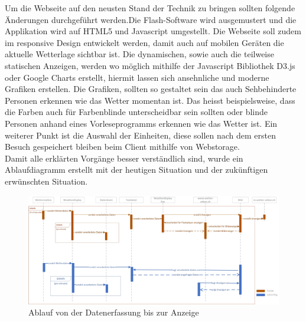 Um die Webseite auf den neusten Stand der Technik zu bringen sollten folgende Änderungen durchgeführt werden.Die Flash-Software wird ausgemustert und die Applikation wird auf HTML5 und Javascript umgestellt. Die Webseite soll zudem im responsive Design entwickelt werden, damit auch auf mobilen Geräten die aktuelle Wetterlage sichtbar ist. Die dynamischen, sowie auch die teilweise statischen Anzeigen, werden wo möglich mithilfe der Javascript Bibliothek D3.js oder Google Charts erstellt, hiermit lassen sich ansehnliche und moderne Grafiken erstellen. Die Grafiken, sollten so gestaltet sein das auch Sehbehinderte Personen erkennen wie das Wetter momentan ist. Das heisst beispielsweise, dass die Farben auch für Farbenblinde unterscheidbar sein sollten oder blinde Personen anhand eines Vorleseprogramms erkennen wie das Wetter ist. Ein weiterer Punkt ist die Auswahl der Einheiten, diese sollen nach dem ersten Besuch gespeichert bleiben beim Client mithilfe von Webstorage.  \\
Damit alle erklärten Vorgänge besser verständlich sind, wurde ein Ablaufdiagramm erstellt mit der heutigen Situation und der zukünftigen erwünschten Situation.
\begin{landscape}
\begin{figure}[htbp]
	\centering
	\includegraphics[width=1\linewidth]{img/Sequenzdiagramm_Wetter}
	\caption{Ablauf von der Datenerfassung bis zur Anzeige}
	\label{img:Sequenzdiagramm}
\end{figure}
\end{landscape}